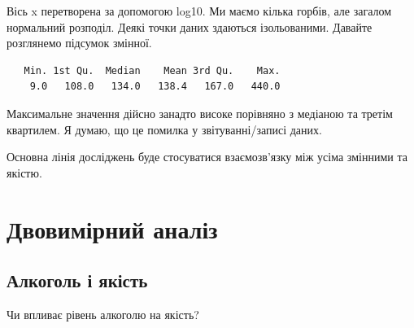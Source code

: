 \documentclass[
  letterpaper,
  DIV=11,
  numbers=noendperiod]{scrreprt}
\newenvironment{Shaded}{\begin{snugshade}}{\end{snugshade}}
\newcommand{\AttributeTok}[1]{\textcolor[rgb]{0.40,0.45,0.13}{#1}}
\newcommand{\FloatTok}[1]{\textcolor[rgb]{0.68,0.00,0.00}{#1}}
\newcommand{\FunctionTok}[1]{\textcolor[rgb]{0.28,0.35,0.67}{#1}}
\newcommand{\NormalTok}[1]{\textcolor[rgb]{0.00,0.23,0.31}{#1}}
\newcommand{\SpecialCharTok}[1]{\textcolor[rgb]{0.37,0.37,0.37}{#1}}
\newcommand{\StringTok}[1]{\textcolor[rgb]{0.13,0.47,0.30}{#1}}
\begin{document}
Вісь x перетворена за допомогою log10. Ми маємо кілька горбів, але
загалом нормальний розподіл. Деякі точки даних здаються ізольованими.
Давайте розглянемо підсумок змінної.

\begin{Shaded}
\end{Shaded}

\begin{verbatim}
   Min. 1st Qu.  Median    Mean 3rd Qu.    Max. 
    9.0   108.0   134.0   138.4   167.0   440.0 
\end{verbatim}

Максимальне значення дійсно занадто високе порівняно з медіаною та
третім квартилем. Я думаю, що це помилка у звітуванні/записі даних.

Основна лінія досліджень буде стосуватися взаємозв'язку між усіма
змінними та якістю.

\section{Двовимірний
аналіз}\label{ux434ux432ux43eux432ux438ux43cux456ux440ux43dux438ux439-ux430ux43dux430ux43bux456ux437}

\subsection{Алкоголь і
якість}\label{ux430ux43bux43aux43eux433ux43eux43bux44c-ux456-ux44fux43aux456ux441ux442ux44c}

Чи впливає рівень алкоголю на якість?

\begin{Shaded}
\end{Shaded}
\end{document}
